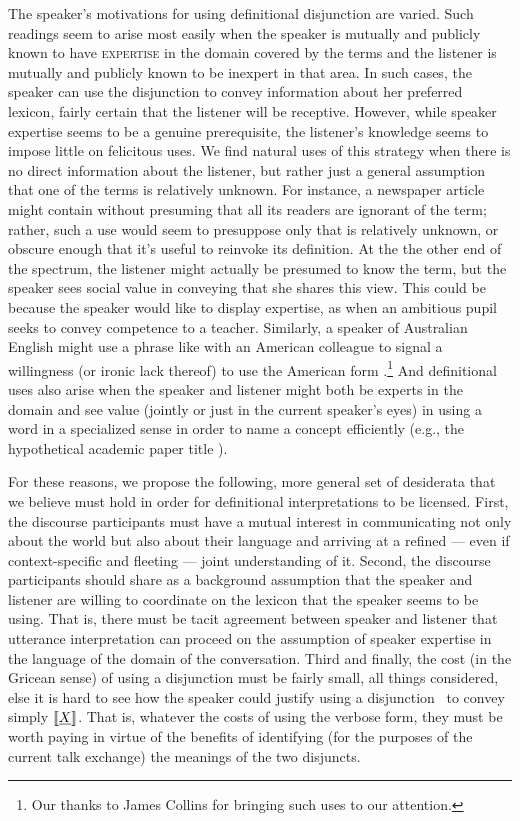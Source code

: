 \documentclass[12pt,twoside]{article}
\renewcommand{\_}{\textbf{\textunderscore\hspace{-4pt}\textunderscore\hspace{-3pt}\textunderscore\hspace{-4pt}\textunderscore}\hspace{0.5pt}}			%
\newcommand{\technicalTerm}[1]{\textsc{#1}}
\begin{document}
The speaker's motivations for using definitional disjunction are
varied. Such readings seem to arise most easily when the speaker is
mutually and publicly known to have \technicalTerm{expertise} in the
domain covered by the terms and the listener is mutually and publicly
known to be inexpert in that area. In such cases, the speaker can use
the disjunction to convey information about her preferred lexicon,
fairly certain that the listener will be receptive. However, while
speaker expertise seems to be a genuine prerequisite, the listener's
knowledge seems to impose little on felicitous uses. We find natural
uses of this strategy when there is no direct information about the
listener, but rather just a general assumption that one of the terms
is relatively unknown. For instance, a newspaper article might contain
 without presuming that all its readers
are ignorant of the term; rather, such a use would seem to presuppose
only that  is relatively unknown, or obscure enough
that it's useful to reinvoke its definition. At the the other end of
the spectrum, the listener might actually be presumed to know the
term, but the speaker sees social value in conveying that she shares
this view. This could be because the speaker would like to display
expertise, as when an ambitious pupil seeks to convey competence to a
teacher. Similarly, a speaker of Australian English might use a phrase
like  with an American colleague to signal a
willingness (or ironic lack thereof) to use the American form
.\footnote{Our thanks to James Collins for bringing
  such uses to our attention.}  And definitional uses also arise when
the speaker and listener might both be experts in the domain and see
value (jointly or just in the current speaker's eyes) in using a word
in a specialized sense in order to name a concept efficiently (e.g.,
the hypothetical academic paper title ).

For these reasons, we propose the following, more general set of
desiderata that we believe must hold in order for definitional
interpretations to be licensed.  First, the discourse participants
must have a mutual interest in communicating not only about the world
but also about their language and arriving at a refined --- even if
context-specific and fleeting --- joint understanding of it. Second,
the discourse participants should share as a background assumption
that the speaker and listener are willing to coordinate on the lexicon
that the speaker seems to be using.  That is, there must be tacit
agreement between speaker and listener that utterance interpretation
can proceed on the assumption of speaker expertise in the language of
the domain of the conversation.  Third and finally, the cost (in the
Gricean sense) of using a disjunction must be fairly small, all things
considered, else it is hard to see how the speaker could justify using
a disjunction \XorY\ to convey simply $\llbracket\emph{X\/}\rrbracket$.  That is,
whatever the costs of using the verbose form, they must be worth
paying in virtue of the benefits of identifying (for the purposes of
the current talk exchange) the meanings of the two disjuncts.
\end{document}
